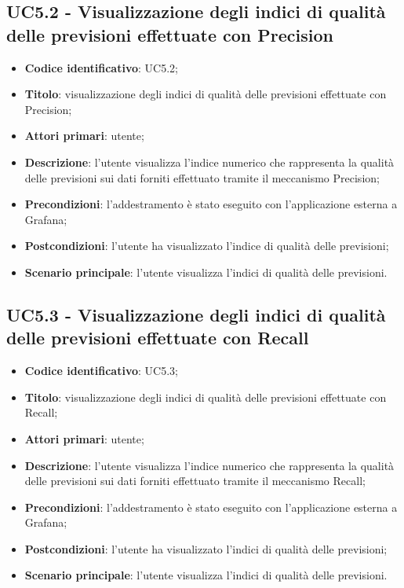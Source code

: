 \subsection{UC5.2 - Visualizzazione degli indici di qualità delle previsioni effettuate con Precision}
\begin{itemize}
	\item \textbf{Codice identificativo}: UC5.2;
	\item \textbf{Titolo}: visualizzazione degli indici di qualità delle previsioni effettuate con Precision\glo;
	\item \textbf{Attori primari}: utente;
	\item \textbf{Descrizione}: l'utente visualizza l'indice numerico che rappresenta la qualità delle previsioni sui dati forniti effettuato tramite il meccanismo Precision\glo;
	\item \textbf{Precondizioni}: l'addestramento è stato eseguito con l'applicazione esterna a Grafana\glo;
	\item \textbf{Postcondizioni}: l'utente ha visualizzato l'indice di qualità delle previsioni;
	\item \textbf{Scenario principale}: l'utente visualizza l'indici di qualità delle previsioni.
\end{itemize} 
\subsection{UC5.3 - Visualizzazione degli indici di qualità delle previsioni effettuate con Recall}
\begin{itemize}
	\item \textbf{Codice identificativo}: UC5.3;
	\item \textbf{Titolo}: visualizzazione degli indici di qualità delle previsioni effettuate con Recall\glo;
	\item \textbf{Attori primari}: utente;
	\item \textbf{Descrizione}: l'utente visualizza l'indice numerico che rappresenta la qualità delle previsioni sui dati forniti effettuato tramite il meccanismo Recall\glo;
	\item \textbf{Precondizioni}: l'addestramento è stato eseguito con l'applicazione esterna a Grafana\glo;
	\item \textbf{Postcondizioni}: l'utente ha visualizzato l'indici di qualità delle previsioni;
	\item \textbf{Scenario principale}: l'utente visualizza l'indici di qualità delle previsioni.
\end{itemize} 

